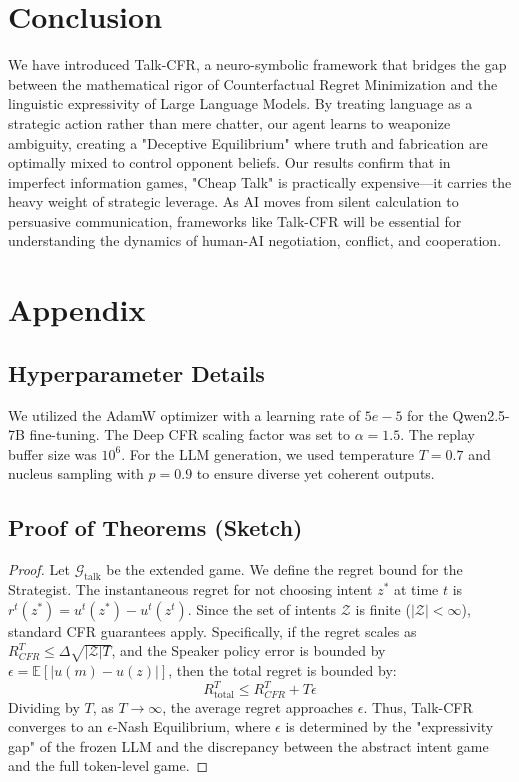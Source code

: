 \documentclass{article}
\begin{document}
\section{Conclusion}
We have introduced Talk-CFR, a neuro-symbolic framework that bridges the gap between the mathematical rigor of Counterfactual Regret Minimization and the linguistic expressivity of Large Language Models. By treating language as a strategic action rather than mere chatter, our agent learns to weaponize ambiguity, creating a "Deceptive Equilibrium" where truth and fabrication are optimally mixed to control opponent beliefs. Our results confirm that in imperfect information games, "Cheap Talk" is practically expensive—it carries the heavy weight of strategic leverage. As AI moves from silent calculation to persuasive communication, frameworks like Talk-CFR will be essential for understanding the dynamics of human-AI negotiation, conflict, and cooperation.


\nocite{*} %


\newpage
\appendix
\section{Appendix}

\subsection{Hyperparameter Details}
We utilized the AdamW optimizer with a learning rate of $5e-5$ for the Qwen2.5-7B fine-tuning. The Deep CFR scaling factor was set to $\alpha=1.5$. The replay buffer size was $10^6$. For the LLM generation, we used temperature $T=0.7$ and nucleus sampling with $p=0.9$ to ensure diverse yet coherent outputs.

\subsection{Proof of Theorems (Sketch)}
\begin{proof}
Let $\mathcal{G}_{\text{talk}}$ be the extended game. We define the regret bound for the Strategist.
The instantaneous regret for not choosing intent $z^*$ at time $t$ is $r^t(z^*) = u^t(z^*) - u^t(z^t)$.
Since the set of intents $\mathcal{Z}$ is finite ($|\mathcal{Z}| < \infty$), standard CFR guarantees apply.
Specifically, if the regret scales as $R^T_{CFR} \le \Delta \sqrt{|\mathcal{Z}|T}$, and the Speaker policy error is bounded by $\epsilon = \mathbb{E}[|u(m) - u(z)|]$, then the total regret is bounded by:
$$ R^T_{\text{total}} \le R^T_{CFR} + T\epsilon $$
Dividing by $T$, as $T \to \infty$, the average regret approaches $\epsilon$. Thus, Talk-CFR converges to an $\epsilon$-Nash Equilibrium, where $\epsilon$ is determined by the "expressivity gap" of the frozen LLM and the discrepancy between the abstract intent game and the full token-level game.
\end{proof}
\end{document}

